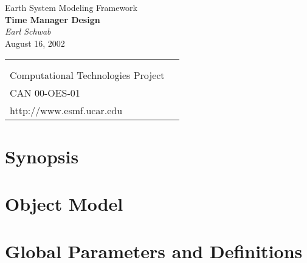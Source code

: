 \documentclass[]{article}
\begin{document}

\begin{titlepage}

\begin{center}
{\Large Earth System Modeling Framework } \\
\vspace{.25in}
{\Large {\bf Time Manager Design}} \\
\vspace{.25in}
{\large {\it Earl Schwab}} \\
\vspace{.25in}
{August 16, 2002}
\vspace{.5in}
\end{center}

\begin{latexonly}
\vspace{5.5in}
\begin{tabular}{p{5in}p{.9in}}
\hrulefill \\
\noindent {\bf NASA Earth Science Technology Office} \\
\noindent Computational Technologies Project \\
\noindent CAN 00-OES-01 \\
\noindent http://www.esmf.ucar.edu \\
\end{tabular}
\end{latexonly}

\end{titlepage}

\tableofcontents

\newpage
\section{Synopsis}


\section{Object Model}






\section{Global Parameters and Definitions}


\end{document}
